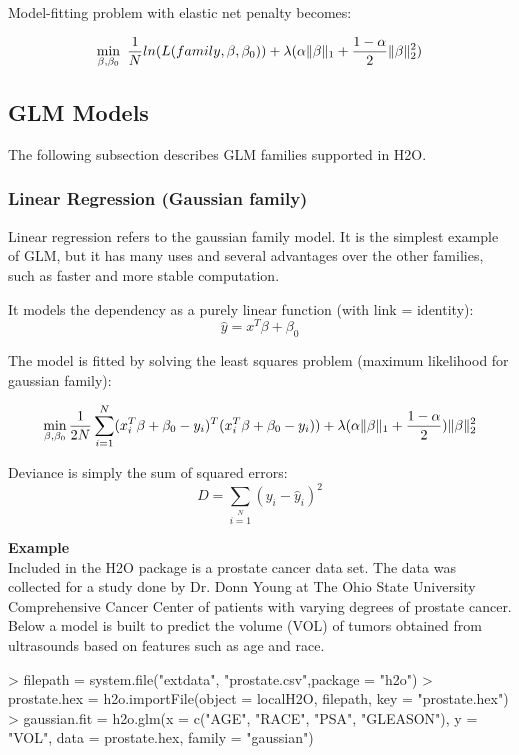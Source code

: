 \documentclass[11pt]{article}
\begin{document}
Model-fitting problem with elastic net penalty becomes:

\[ \min\limits_{\beta,\beta_0}\ {{1\over{N}} ln(L(family,\beta,\beta_0))  + \lambda (\alpha \| \beta \|_1}  + {1- \alpha \over 2} \| \beta \|_2^2) \]


\subsection{GLM Models} 
The following subsection describes GLM families supported in H2O. 

\subsubsection{Linear Regression (Gaussian family) }
Linear regression refers to the gaussian family model. It is the simplest example of GLM, but it has many uses and several advantages over the other families, such as faster and more stable computation. 

It models the dependency as a purely linear function (with link = identity):
\[ \hat{y} = x^T\beta + \beta_0\]

The model is fitted by solving the least squares problem (maximum likelihood for gaussian family):

\[ \min\limits_{\beta,\beta_0} { {1 \over 2N}\sum\limits_{i=1}\limits^{N}(x_i^{T}\beta  + \beta_0- y_i)^T (x_i^{T}\beta + \beta_0 - y_i))  + \lambda (\alpha \|\beta \|_1 + {1-\alpha \over 2}) \| \beta \|_2^2} \]


Deviance is simply the sum of squared errors:
\[ D = \sum\limits_{i=1}\limits^{N}{(y_i - \hat{y}_i)^2} \]


\textbf{Example}\\
Included in the H2O package is a prostate cancer data set. The data was collected for a study done by Dr. Donn Young at The Ohio State University Comprehensive Cancer Center of patients with varying degrees of prostate cancer. Below a model is built to predict the volume (VOL) of tumors obtained from ultrasounds based on features such as age and race.

\begin{spverbatim}
> filepath = system.file("extdata", "prostate.csv",package = "h2o")
> prostate.hex = h2o.importFile(object = localH2O, filepath, key = "prostate.hex")
> gaussian.fit = h2o.glm(x = c("AGE", "RACE", "PSA", "GLEASON"), y = "VOL", data = prostate.hex, family = "gaussian")
\end{spverbatim}
\end{document}

